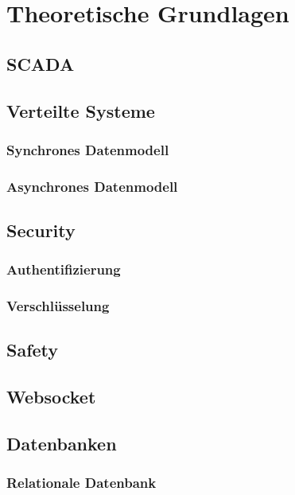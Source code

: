 \chapter{Theoretische Grundlagen}
\section{SCADA}
\section{Verteilte Systeme}
\subsection{Synchrones Datenmodell}
\subsection{Asynchrones Datenmodell}
\section{Security}
\subsection{Authentifizierung}
\subsection{Verschlüsselung}
\section{Safety}
\section{Websocket}

\section{Datenbanken}
\subsection{Relationale Datenbank}\label{subsec:relDB}

